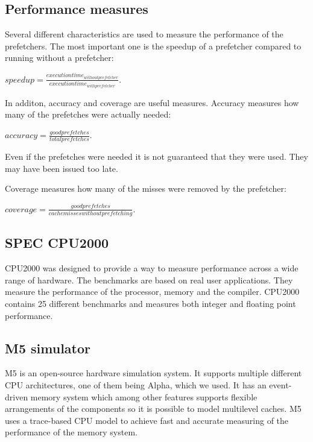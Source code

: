 \subsection{Performance measures}
Several different characteristics are used to measure the performance
of the prefetchers. The most important one is the speedup of a
prefetcher compared to running without a prefetcher:

$speedup = \frac{execution time_{without prefetcher}}{execution time_{with prefetcher}}$.

In additon, accuracy and coverage are useful measures. Accuracy measures
how many of the prefetches were actually needed:

$accuracy = \frac{good prefetches}{total prefetches}$.

Even if the prefetches were needed it is not guaranteed that they
were used. They may have been issued too late.

Coverage measures how many of the misses were removed by the
prefetcher:

$coverage = \frac{good prefetches}{cache misses without prefetching}$.

\cite{bib:doc}

\subsection{SPEC CPU2000}
CPU2000 was designed to provide a way to measure performance across
a wide range of hardware. The benchmarks are based on real user
applications. They measure the performance of the processor, memory
and the compiler. CPU2000 contains 25 different benchmarks and
measures both integer and floating point performance.

\cite{bib:cpu2000}

\subsection{M5 simulator}
M5 is an open-source hardware simulation system. It supports multiple
different CPU architectures, one of them being Alpha, which we used.
It has an event-driven memory system which among other features supports
flexible arrangements of the components so it is possible to model
multilevel caches. M5 uses a trace-based CPU model to achieve fast and
accurate measuring of the performance of the memory system.

\cite{bib:m5}

